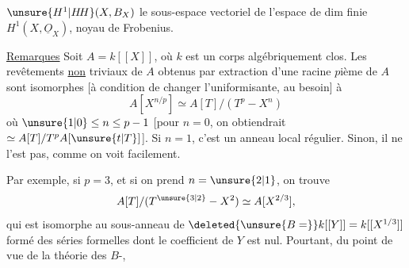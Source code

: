 $\unsure{H^1|H\!H}(X,B_X)$ le sous-espace vectoriel de l'espace de dim finie $H^1(X,\underline O_X)$,  noyau de Frobenius.

\uline{Remarques} Soit $A=k[[X]]$, où $k$ est un corps algébriquement clos. Les revêtements \uline{non} triviaux   de $A$ obtenus par extraction d'une racine $p$ième de $A$ sont  isomorphes
[à condition de changer l'uniformisante, au besoin] à
\[
A[X^{n/p}]\simeq A[T]/(T^p-X^n)
\]
où $\unsure{1|0}\leq n\leq p-1$  [pour $n=0$, on obtiendrait $\simeq A[T]/T^pA[\unsure{t|T}]$]. Si $n=1$, c'est un anneau local régulier. Sinon, il ne l'est pas, comme on voit facilement.

Par exemple, si $p=3$,  et si on prend $n=\unsure{2|1}$, on trouve
\[
A[T]/(T^{\unsure{3|2}}-X^2)\simeq A[X^{2/3}],
\]
qui est isomorphe au sous-anneau de $\deleted{\unsure{B=}}k[[Y]]=k[[X^{1/3}]]$ formé des séries formelles dont le coefficient de $Y$ est nul. Pourtant, du point de vue de la théorie des $B$-,

